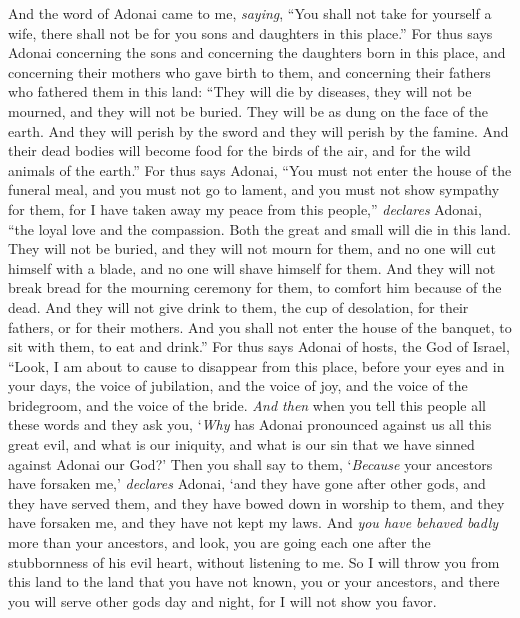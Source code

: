 \begin{biblechapter} %
 And the word of Adonai came to me, \textit{saying},
\verse “You shall not take for yourself a wife, there shall not be for you sons and daughters in this place.”
\verse For thus says Adonai concerning the sons and concerning the daughters born in this place, and concerning their mothers who gave birth to them, and concerning their fathers who fathered them in this land:
\verse “They will die by diseases, they will not be mourned, and they will not be buried. They will be as dung on the face of the earth. And they will perish by the sword and they will perish by the famine. And their dead bodies will become food for the birds of the air, and for the wild animals of the earth.”
\verse For thus says Adonai, “You must not enter the house of the funeral meal, and you must not go to lament, and you must not show sympathy for them, for I have taken away my peace from this people,” \textit{declares} Adonai, “the loyal love and the compassion.
\verse Both the great and small will die in this land. They will not be buried, and they will not mourn for them, and no one will cut himself with a blade, and no one will shave himself for them.
\verse And they will not break bread for the mourning ceremony for them, to comfort him because of the dead. And they will not give drink to them, the cup of desolation, for their fathers, or for their mothers.
\verse And you shall not enter the house of the banquet, to sit with them, to eat and drink.”
\verse For thus says Adonai of hosts, the God of Israel, “Look, I am about to cause to disappear from this place, before your eyes and in your days, the voice of jubilation, and the voice of joy, and the voice of the bridegroom, and the voice of the bride.
\verse \textit{And then} when you tell this people all these words and they ask you, ‘\textit{Why} has Adonai pronounced against us all this great evil, and what is our iniquity, and what is our sin that we have sinned against Adonai our God?’
\verse Then you shall say to them, ‘\textit{Because} your ancestors have forsaken me,’ \textit{declares} Adonai, ‘and they have gone after other gods, and they have served them, and they have bowed down in worship to them, and they have forsaken me, and they have not kept my laws.
\verse And \textit{you have behaved badly} more than your ancestors, and look, you are going each one after the stubbornness of his evil heart, without listening to me.
\verse So I will throw you from this land to the land that you have not known, you or your ancestors, and there you will serve other gods day and night, for I will not show you favor.

\end{biblechapter}
